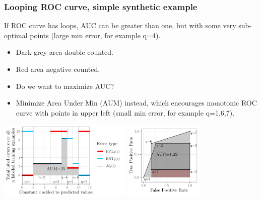 \documentclass{beamer}
\begin{document}
\begin{frame}
  \frametitle{Looping ROC curve, simple synthetic example}

If ROC curve has loops, AUC can be greater than one, but with some
very sub-optimal points (large min error, for example q=4).

  \begin{itemize}
  \item Dark grey area double counted.
  \item Red area negative counted.
  \item Do we want to maximize AUC?
  \item Minimize Area Under Min (AUM) instead, which encourages
    monotonic ROC curve with points in upper left (small min error,
    for example q=1,6,7).
  \end{itemize}
 
  \includegraphics[height=1.5in]{figure-more-than-one-more-aum-nomath}
  \includegraphics[height=1.5in]{figure-more-than-one-more-auc}

\end{frame}
\end{document}
